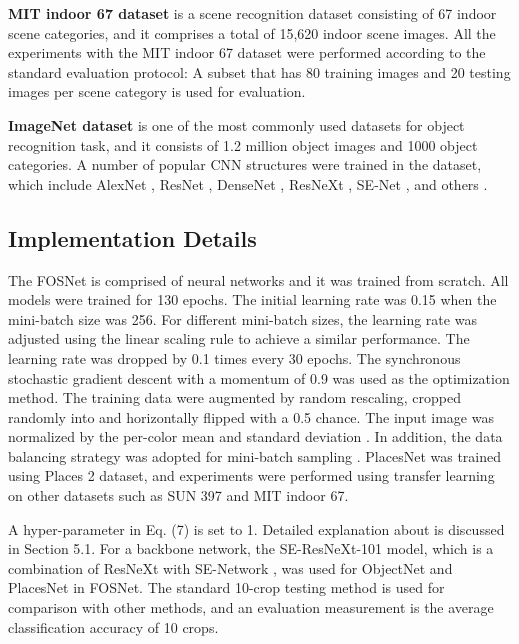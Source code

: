 \documentclass[journal,comsoc]{IEEEtran}
\begin{document}
\textbf{MIT indoor 67 dataset} \cite{b34} is a scene recognition dataset consisting of 67 indoor scene categories, and it comprises a total of 15,620 indoor scene images. All the experiments with the MIT indoor 67 dataset were performed according to the standard evaluation protocol: A subset that has 80 training images and 20 testing images per scene category is used for evaluation. 

\textbf{ImageNet dataset} \cite{b19} is one of the most commonly used datasets for object recognition task, and it consists of 1.2 million object images and 1000 object categories. A number of popular CNN structures were trained in the dataset, which include AlexNet \cite{b18}, ResNet \cite{b23}, DenseNet \cite{b26}, ResNeXt \cite{b27}, SE-Net \cite{b28}, and others \cite{b29,b30,b31}.



\subsection{Implementation Details}
\label{s42}
The FOSNet is comprised of neural networks and it was trained from scratch. All models were trained for 130 epochs. The initial learning rate was 0.15 when the mini-batch size was 256. For different mini-batch sizes, the learning rate was adjusted using the linear scaling rule \cite{b37} to achieve a similar performance. The learning rate was dropped by 0.1 times every 30 epochs. The synchronous stochastic gradient descent with a momentum of 0.9 was used as the optimization method. The training data were augmented by random rescaling, cropped randomly into  \cite{b30,b46} and horizontally flipped with a 0.5 chance. The input image was normalized by the per-color mean and standard deviation \cite{b46}. In addition, the data balancing strategy \cite{b11} was adopted for mini-batch sampling \cite{b28}. PlacesNet was trained using Places 2 dataset, and experiments were performed using transfer learning \cite{b38} on other datasets such as SUN 397 and MIT indoor 67.

A hyper-parameter  in Eq. (7) is set to 1. Detailed explanation about  is discussed in Section 5.1. For a backbone network, the SE-ResNeXt-101 model, which is a combination of ResNeXt \cite{b27} with SE-Network \cite{b28}, was used for ObjectNet and PlacesNet in FOSNet. The standard 10-crop testing method \cite{b5} is used for comparison with other methods, and an evaluation measurement is the average classification accuracy of 10 crops.
\end{document}
